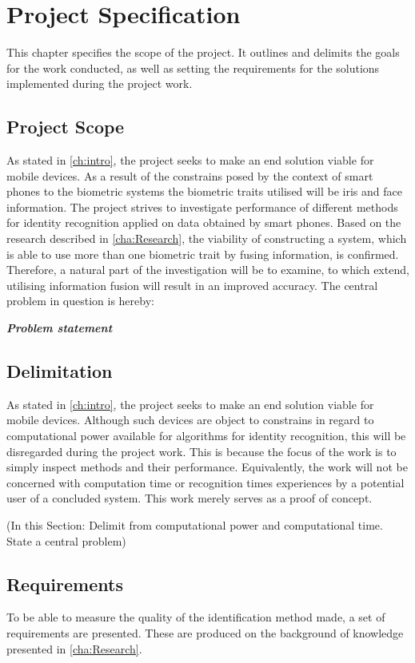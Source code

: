 \chapter{Project Specification}\glsresetall
This chapter specifies the scope of the project. It outlines and delimits the goals for the work conducted, as well as setting the requirements for the solutions implemented during the project work. 

\section{Project Scope}
As stated in \autoref{ch:intro}, the project seeks to make an end solution viable for mobile devices. As a result of the constrains posed by the context of smart phones to the biometric systems the biometric traits utilised will be iris and face information. The project strives to investigate performance of different methods for identity recognition applied on data obtained by smart phones. Based on the research described in \autoref{cha:Research}, the viability of constructing a system, which is able to use more than one biometric trait by fusing information, is confirmed. Therefore, a natural part of the investigation will be to examine, to which extend, utilising information fusion will result in an improved accuracy. The central problem in question is hereby:

\textit{\textbf{Problem statement}}


 

\section{Delimitation}\label{sec:deliproject}
As stated in \autoref{ch:intro}, the project seeks to make an end solution viable for mobile devices. Although such devices are object to constrains in regard to computational power available for algorithms for identity recognition, this will be disregarded during the project work. This is because the focus of the work is to simply inspect methods and their performance. Equivalently, the work will not be concerned with computation time or recognition times experiences by a potential user of a concluded system. This work merely serves as a proof of concept.



(In this Section: Delimit from computational power and computational time. State a central problem)   


\section{Requirements}\label{ch:req}
To be able to measure the quality of the identification method made, a set of requirements are presented. These are produced on the background of knowledge presented in \autoref{cha:Research}.


